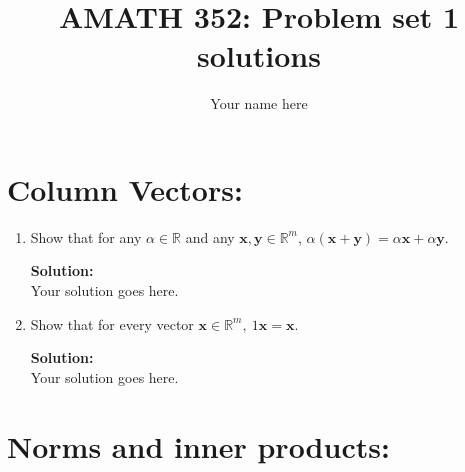 \documentclass[]{article}
\title{AMATH 352: Problem set 1 solutions}
\author{Your name here}
\newcommand{\R}{\mathbb{R}}
\newcommand{\solution}{\vskip 0.5cm \textbf{\large Solution:} \\}
\begin{document}
\maketitle

\section*{Column Vectors:}

\begin{enumerate}

	\item Show that for any $\alpha\in\R$ and any $\bm{x},\bm{y}\in\mathbb{R}^m$, $\alpha(\bm{x}+\bm{y}) = \alpha\bm{x} + \alpha\bm{y}$.


	\solution
	Your solution goes here.

	\item Show that for every vector $\bm{x}\in\mathbb{R}^m,~ 1\bm{x}=\bm{x}$.

	\solution
	Your solution goes here.
\end{enumerate}


\section*{Norms and inner products:}
\end{document}
